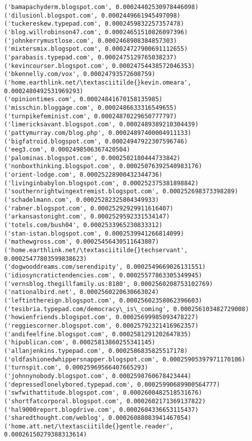\documentclass[11pt]{article}
\begin{document}
\begin{Verbatim}[commandchars=\\\{\}]
('bamapachyderm.blogspot.com', 0.00024402530978446098)
('dilusionl.blogspot.com', 0.0002449661945497098)
('tuckereskew.typepad.com', 0.0002459832257357478)
('blog.willrobinson47.com', 0.00024651510826097396)
('johnkerrymustlose.com', 0.0002468908384857303)
('mixtersmix.blogspot.com', 0.00024727900691112655)
('parabasis.typepad.com', 0.0002475129765038237)
('kevincourser.blogspot.com', 0.00024754438572046353)
('bkennelly.com/vox', 0.00024793572608759)
('home.earthlink.net/\textasciitilde{}kevin.omeara', 0.0002480492531969293)
('opiniontimes.com', 0.00024841670158135985)
('misschin.bloggage.com', 0.0002486633316549655)
('turnpikefeminist.com', 0.00024870229650777797)
('limericksavant.blogspot.com', 0.0002489389210304439)
('pattymurray.com/blog.php', 0.00024897400004911133)
('bigfatroid.blogspot.com', 0.00024947922307596746)
('eeg3.com', 0.0002498506367420504)
('palominas.blogspot.com', 0.0002502180444733842)
('nonboxthinking.blogspot.com', 0.00025076392540983176)
('orient-lodge.com', 0.00025228900432344736)
('livinginbabylon.blogspot.com', 0.000252375381898842)
('southernrightwingextremist.blogspot.com', 0.000252698373398289)
('schadelmann.com', 0.00025282325804349933)
('rabner.blogspot.com', 0.00025292929911616407)
('arkansastonight.com', 0.0002529592331534147)
('totels.com/bush04', 0.0002533965230833312)
('stan-istan.blogspot.com', 0.0002539941266814099)
('mathewgross.com', 0.00025456430511643807)
('home.earthlink.net/\textasciitilde{}techservant', 0.00025477803599838623)
('dogwooddreams.com/serendipity', 0.0002549669026131551)
('idiosyncratictendencies.com', 0.00025577863305349945)
('vernsblog.thegillfamily.us:8180', 0.0002560208753102769)
('nationalbird.net', 0.0002560220630663024)
('leftinthereign.blogspot.com', 0.00025602358062396603)
('tesibria.typepad.com/democracy\_is\_coming', 0.000256103482729008)
('howienfriends.blogspot.com', 0.00025699985093478227)
('reggiescorner.blogspot.com', 0.00025792321416962357)
('andifeelfine.blogspot.com', 0.0002581291202647835)
('hipublican.com', 0.00025813860255341145)
('allanjenkins.typepad.com', 0.0002586835825517178)
('oldfashionedwhippersnapper.blogspot.com', 0.00025905397971170106)
('turnspit.com', 0.00025969566407665293)
('johnnynobody.blogspot.com', 0.0002598760678423444)
('depressedlonelybored.typepad.com', 0.00025990689900564777)
('swfwithattitude.blogspot.com', 0.0002600482518531676)
('shortfatcorporal.blogspot.com', 0.0002602171369137822)
('hal9000report.blogdrive.com', 0.0002604336653115437)
('sharedthought.com/weblog', 0.00026088083941467054)
('home.att.net/\textasciitilde{}gentle.reader', 0.00026150279388313614)

\end{Verbatim}
\end{document}

